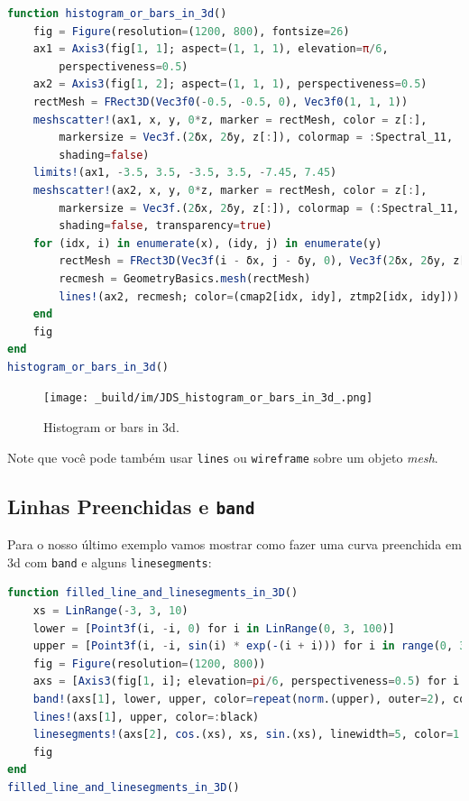 \documentclass[
  notoc %
]{tufte-book}
\newcommand{\passthrough}[1]{#1}
\begin{document}
\begin{lstlisting}[language=Julia]
function histogram_or_bars_in_3d()
    fig = Figure(resolution=(1200, 800), fontsize=26)
    ax1 = Axis3(fig[1, 1]; aspect=(1, 1, 1), elevation=π/6,
        perspectiveness=0.5)
    ax2 = Axis3(fig[1, 2]; aspect=(1, 1, 1), perspectiveness=0.5)
    rectMesh = FRect3D(Vec3f0(-0.5, -0.5, 0), Vec3f0(1, 1, 1))
    meshscatter!(ax1, x, y, 0*z, marker = rectMesh, color = z[:],
        markersize = Vec3f.(2δx, 2δy, z[:]), colormap = :Spectral_11,
        shading=false)
    limits!(ax1, -3.5, 3.5, -3.5, 3.5, -7.45, 7.45)
    meshscatter!(ax2, x, y, 0*z, marker = rectMesh, color = z[:],
        markersize = Vec3f.(2δx, 2δy, z[:]), colormap = (:Spectral_11, 0.25),
        shading=false, transparency=true)
    for (idx, i) in enumerate(x), (idy, j) in enumerate(y)
        rectMesh = FRect3D(Vec3f(i - δx, j - δy, 0), Vec3f(2δx, 2δy, z[idx, idy]))
        recmesh = GeometryBasics.mesh(rectMesh)
        lines!(ax2, recmesh; color=(cmap2[idx, idy], ztmp2[idx, idy]))
    end
    fig
end
histogram_or_bars_in_3d()
\end{lstlisting}

\begin{figure}
\hypertarget{fig:histogram_or_bars_in_3d}{%
\centering
\texttt{[image: \_build/im/JDS\_histogram\_or\_bars\_in\_3d\_.png]}
\caption{Histogram or bars in 3d.}\label{fig:histogram_or_bars_in_3d}
}
\end{figure}

Note que você pode também usar \passthrough{\lstinline!lines!} ou
\passthrough{\lstinline!wireframe!} sobre um objeto \emph{mesh}.

\hypertarget{linhas-preenchidas-e-band}{%
\subsection{\texorpdfstring{Linhas Preenchidas e
\texttt{band}}{Linhas Preenchidas e band}}\label{linhas-preenchidas-e-band}}

Para o nosso último exemplo vamos mostrar como fazer uma curva
preenchida em 3d com \passthrough{\lstinline!band!} e alguns
\passthrough{\lstinline!linesegments!}:

\begin{lstlisting}[language=Julia]
function filled_line_and_linesegments_in_3D()
    xs = LinRange(-3, 3, 10)
    lower = [Point3f(i, -i, 0) for i in LinRange(0, 3, 100)]
    upper = [Point3f(i, -i, sin(i) * exp(-(i + i))) for i in range(0, 3, length=100)]
    fig = Figure(resolution=(1200, 800))
    axs = [Axis3(fig[1, i]; elevation=pi/6, perspectiveness=0.5) for i = 1:2]
    band!(axs[1], lower, upper, color=repeat(norm.(upper), outer=2), colormap=:CMRmap)
    lines!(axs[1], upper, color=:black)
    linesegments!(axs[2], cos.(xs), xs, sin.(xs), linewidth=5, color=1:length(xs))
    fig
end
filled_line_and_linesegments_in_3D()
\end{lstlisting}
\end{document}
